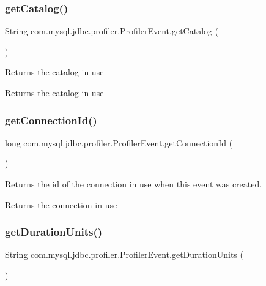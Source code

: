 \subsubsection{\texorpdfstring{get\+Catalog()}{getCatalog()}}
{\footnotesize\ttfamily String com.\+mysql.\+jdbc.\+profiler.\+Profiler\+Event.\+get\+Catalog (\begin{DoxyParamCaption}{ }\end{DoxyParamCaption})}

Returns the catalog in use

\begin{DoxyReturn}{Returns}
the catalog in use 
\end{DoxyReturn}
\mbox{\label{classcom_1_1mysql_1_1jdbc_1_1profiler_1_1_profiler_event_a72cc33be979416c497f5aa95148a9b58}} 
\subsubsection{\texorpdfstring{get\+Connection\+Id()}{getConnectionId()}}
{\footnotesize\ttfamily long com.\+mysql.\+jdbc.\+profiler.\+Profiler\+Event.\+get\+Connection\+Id (\begin{DoxyParamCaption}{ }\end{DoxyParamCaption})}

Returns the id of the connection in use when this event was created.

\begin{DoxyReturn}{Returns}
the connection in use 
\end{DoxyReturn}
\mbox{\label{classcom_1_1mysql_1_1jdbc_1_1profiler_1_1_profiler_event_aecf3c0f13945accbbbe6ba77eb5189ca}} 
\subsubsection{\texorpdfstring{get\+Duration\+Units()}{getDurationUnits()}}
{\footnotesize\ttfamily String com.\+mysql.\+jdbc.\+profiler.\+Profiler\+Event.\+get\+Duration\+Units (\begin{DoxyParamCaption}{ }\end{DoxyParamCaption})}

